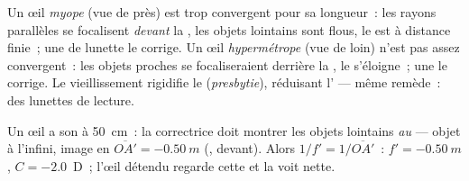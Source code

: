 \begin{definition}\label{def:g11:lenses-and-eye:defects}
Un œil \emph{myope} (vue de près) est trop
convergent pour sa longueur~: les rayons parallèles se
focalisent \emph{devant} la , les objets lointains
sont flous, le  est à distance finie~; une
 de lunette le corrige. Un œil
\emph{hypermétrope} (vue de loin) n'est pas assez
convergent~: les objets proches se focaliseraient derrière
la , le 
s'éloigne~; une  le corrige. Le
vieillissement rigidifie le 
(\emph{presbytie}), réduisant
l' --- même remède~: des lunettes de
lecture.
\end{definition}

\begin{example}\label{ex:g11:lenses-and-eye:correction}
Un œil  a son 
à \qty{50}{cm}~: la  correctrice doit montrer les
objets lointains \emph{au } --- objet à
l'infini, image en $\overline{OA'} = \qty{-0.50}{m}$
(, devant). Alors $1/f' = 1/\overline{OA'}$~:
$f' = \qty{-0.50}{m}$, $C = -2.0$~D~; l'œil détendu regarde cette
 et la voit nette.
\end{example}

